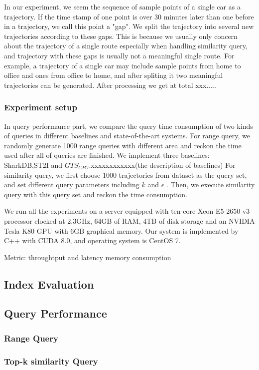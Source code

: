 \documentclass[conference]{IEEEtran}
\begin{document}
In our experiment, we seem the sequence of sample points of a single car as a trajectory. If the time stamp of one point is over 30 minutes later than one before in a trajectory, we call this point a "gap". We split the trajectory into several new trajectories according to these gaps. This is because we usually only concern about the trajectory of a single route especially when handling similarity query, and trajectory with these gaps is usually not a meaningful single route. For example, a trajectory of a single car may include sample points from home to office and ones from office to home, and after spliting it two meaningful trajectories can be generated. After processing we get at total xxx.....

\subsubsection{Experiment setup}
In query performance part, we compare the query time consumption of two kinds of queries in different baselines and state-of-the-art systems. For range query, we randomly generate 1000 range queries with different area and reckon the time used after all of queries are finished. We implement three baselines: SharkDB,ST2I and $GTS_{CPU}$.xxxxxxxxxxxx(the description of baselines)
For similarity query, we first choose 1000 trajectories from dataset as the query set, and set different query parameters including $k$ and $\epsilon$ . Then, we execute similarity query with this query set and reckon the time consumption.
 

We run all the experiments on a server equipped with ten-core Xeon E5-2650 v3 processor clocked at 2.3GHz, 64GB of RAM, 4TB of disk storage and an NVIDIA Tesla K80 GPU with 6GB graphical memory. Our system is implemented by C++ with CUDA 8.0, and operating system is CentOS 7.


Metric:
	throughtput and latency
	memory consumption


\subsection{Index Evaluation}
\subsection{Query Performance}
\subsubsection{Range Query}
\subsubsection{Top-k similarity Query}
\end{document}

